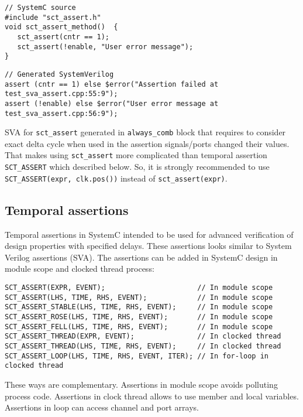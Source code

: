 \begin{lstlisting}[style=mycpp]
// SystemC source
#include "sct_assert.h"
void sct_assert_method()  {
   sct_assert(cntr == 1);
   sct_assert(!enable, "User error message");
}
\end{lstlisting}
%
\begin{lstlisting}[style=myverilog]
// Generated SystemVerilog
assert (cntr == 1) else $error("Assertion failed at test_sva_assert.cpp:55:9");
assert (!enable) else $error("User error message at test_sva_assert.cpp:56:9");
\end{lstlisting}

SVA for {\tt sct\_assert} generated in {\tt always\_comb} block that requires to consider exact delta cycle when used in the assertion signals/ports changed their values. That makes using {\tt sct\_assert} more complicated than temporal assertion {\tt SCT\_ASSERT} which described below. So, it is strongly recommended to use {\tt SCT\_ASSERT(expr, clk.pos())} instead of {\tt sct\_assert(expr)}.

\subsection{Temporal assertions}

Temporal assertions in SystemC intended to be used for advanced verification of design properties with specified delays. These assertions looks similar to System Verilog assertions (SVA). The assertions can be added in SystemC design in module scope and clocked thread process:

\begin{lstlisting}[style=mycpp]
SCT_ASSERT(EXPR, EVENT);                      // In module scope 
SCT_ASSERT(LHS, TIME, RHS, EVENT);            // In module scope 
SCT_ASSERT_STABLE(LHS, TIME, RHS, EVENT);     // In module scope 
SCT_ASSERT_ROSE(LHS, TIME, RHS, EVENT);       // In module scope 
SCT_ASSERT_FELL(LHS, TIME, RHS, EVENT);       // In module scope 
SCT_ASSERT_THREAD(EXPR, EVENT);               // In clocked thread 
SCT_ASSERT_THREAD(LHS, TIME, RHS, EVENT);     // In clocked thread 
SCT_ASSERT_LOOP(LHS, TIME, RHS, EVENT, ITER); // In for-loop in clocked thread
\end{lstlisting}
%
These ways are complementary. Assertions in module scope avoids polluting process code. Assertions in clock thread allows to use member and local variables. Assertions in loop can access channel and port arrays.

